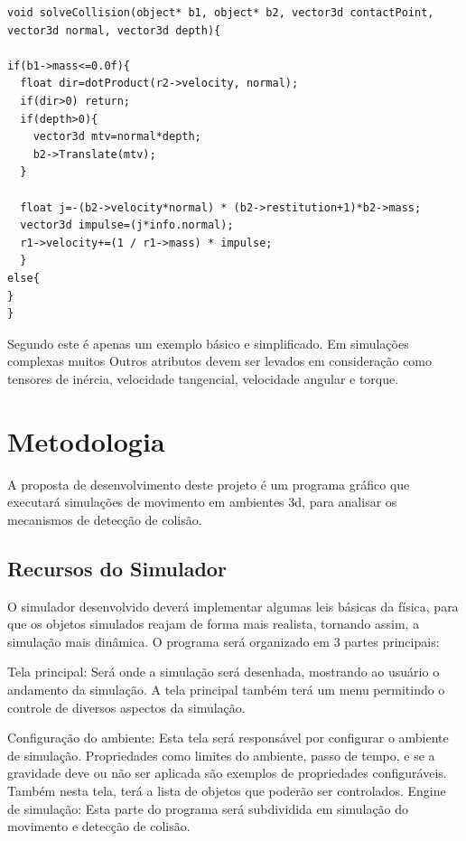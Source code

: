 \begin{lstlisting}[frame=single,caption=Exemplo de resolução de colisão\label{code:solveCollision}]
void solveCollision(object* b1, object* b2, vector3d contactPoint, vector3d normal, vector3d depth){

if(b1->mass<=0.0f){
  float dir=dotProduct(r2->velocity, normal);
  if(dir>0) return;
  if(depth>0){
    vector3d mtv=normal*depth;
    b2->Translate(mtv);
  }

  float j=-(b2->velocity*normal) * (b2->restitution+1)*b2->mass;
  vector3d impulse=(j*info.normal);
  r1->velocity+=(1 / r1->mass) * impulse;
  }
else{
}
}
\end{lstlisting}

Segundo  este é apenas um exemplo básico e simplificado. Em simulações complexas muitos Outros atributos devem ser levados em consideração como tensores de inércia, velocidade tangencial, velocidade angular e torque.

\section{Metodologia}

A  proposta de desenvolvimento deste projeto é um programa gráfico que
executará simulações de movimento em ambientes 3d, para analisar os mecanismos de detecção de colisão.

\subsection{Recursos do Simulador}
O simulador desenvolvido deverá implementar algumas leis básicas da física, para que os objetos simulados reajam de forma mais realista, tornando assim, a simulação mais dinâmica. O programa será organizado em 3 partes principais:

Tela principal: Será onde a simulação será desenhada, mostrando ao usuário o andamento da simulação. A tela principal também terá um menu permitindo o controle de diversos aspectos da simulação. 

Configuração do ambiente: Esta tela será responsável por configurar o ambiente de simulação. Propriedades como limites do ambiente, passo de tempo, e se a gravidade deve ou não ser aplicada são exemplos de propriedades configuráveis. Também nesta tela, terá a lista de objetos que poderão ser controlados.
Engine de simulação: Esta parte do programa será subdividida em simulação do movimento e detecção de colisão. 


